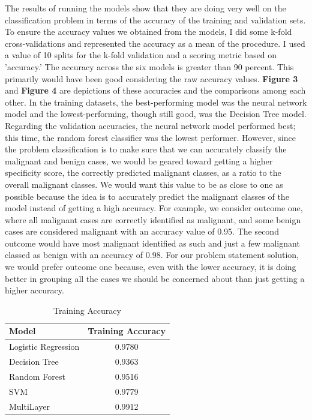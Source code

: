 \documentclass[10pt,twocolumn,letterpaper]{article}
\begin{document}
The results of running the models show that they are doing very well on the classification problem in terms of the accuracy of the training and validation sets. To ensure the accuracy values we obtained from the models, I did some k-fold cross-validations and represented the accuracy as a mean of the procedure. I used a value of 10 splits for the k-fold validation and a scoring metric based on 'accuracy.' The accuracy across the six models is greater than 90 percent. This primarily would have been good considering the raw accuracy values. \textbf{Figure 3} and \textbf{Figure 4} are depictions of these accuracies and the comparisons among each other. In the training datasets, the best-performing model was the neural network model and the lowest-performing, though still good, was the Decision Tree model.
Regarding the validation accuracies, the neural network model performed best; this time, the random forest classifier was the lowest performer. However, since the problem classification is to make sure that we can accurately classify the malignant and benign cases, we would be geared toward getting a higher specificity score, the correctly predicted malignant classes, as a ratio to the overall malignant classes. We would want this value to be as close to one as possible because the idea is to accurately predict the malignant classes of the model instead of getting a high accuracy. For example, we consider outcome one, where all malignant cases are correctly identified as malignant, and some benign cases are considered malignant with an accuracy value of 0.95. The second outcome would have most malignant identified as such and just a few malignant classed as benign with an accuracy of 0.98. For our problem statement solution, we would prefer outcome one because, even with the lower accuracy, it is doing better in grouping all the cases we should be concerned about than just getting a higher accuracy.
\begin{table}
  \centering
  \begin{tabular}{@{}lc@{}}
    \toprule
    Model & Training Accuracy \\
    \midrule
    Logistic Regression & 0.9780 \\
    Decision Tree & 0.9363 \\
    Random Forest & 0.9516 \\
    SVM & 0.9779 \\
    MultiLayer & 0.9912 \\
    \bottomrule
  \end{tabular}
  \caption{Training Accuracy}
  \label{tab:example}
\end{table}
\end{document}
